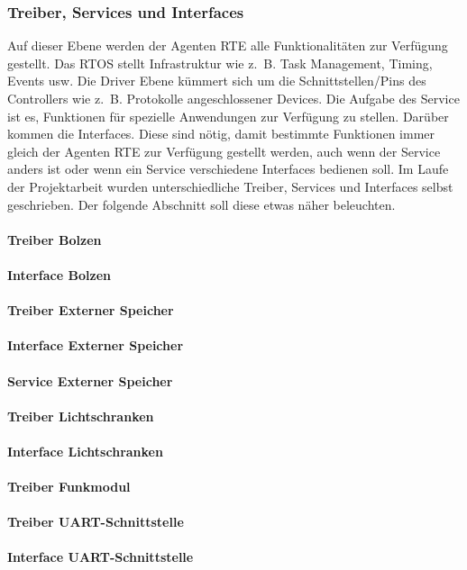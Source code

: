 
\subsubsection{Treiber, Services und Interfaces}
Auf dieser Ebene werden der Agenten RTE alle Funktionalitäten zur Verfügung gestellt. Das RTOS stellt Infrastruktur wie z.~B. Task Management, Timing, Events usw.
Die Driver Ebene kümmert sich um die Schnittstellen/Pins des Controllers wie z.~B. Protokolle angeschlossener
Devices\cite[S. 26]{Stasch:Hahn}. Die Aufgabe des Service ist es, Funktionen für spezielle Anwendungen zur Verfügung zu stellen.
Darüber kommen die Interfaces. Diese sind nötig, damit bestimmte Funktionen immer gleich der Agenten RTE zur Verfügung gestellt werden, auch wenn der Service anders ist oder wenn ein Service verschiedene Interfaces bedienen soll\cite[S. 26]{Stasch:Hahn}. Im Laufe der Projektarbeit wurden unterschiedliche Treiber, Services und Interfaces selbst geschrieben. Der folgende Abschnitt soll diese etwas näher beleuchten.

\paragraph{Treiber Bolzen}

\paragraph{Interface Bolzen}

\paragraph{Treiber Externer Speicher}

\paragraph{Interface Externer Speicher}

\paragraph{Service Externer Speicher}

\paragraph{Treiber Lichtschranken}

\paragraph{Interface Lichtschranken}

\paragraph{Treiber Funkmodul}

\paragraph{Treiber UART-Schnittstelle}

\paragraph{Interface UART-Schnittstelle}

